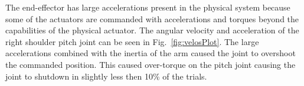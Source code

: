 The end-effector has large accelerations present in the physical system because some of the actuators are commanded with accelerations and torques beyond the capabilities of the physical actuator.  The angular velocity and acceleration of the right shoulder pitch joint can be seen in Fig.~\ref{fig:velosPlot}.  The large accelerations combined with the inertia of the arm caused the joint to overshoot the commanded position.  This caused over-torque on the pitch joint causing the joint to shutdown in slightly less then 10\% of the trials.











